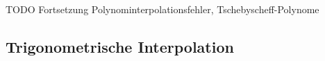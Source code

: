 
TODO Fortsetzung Polynominterpolationsfehler, Tschebyscheff-Polynome

\subsection{Trigonometrische Interpolation}


